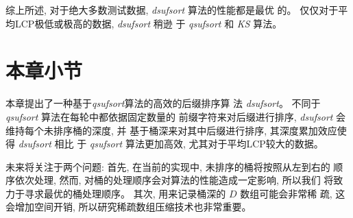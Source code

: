 综上所述, 对于绝大多数测试数据, \emph{dsufsort} 算法的性能都是最优
的。 仅仅对于平均LCP极低或极高的数据, \emph{dsufsort} 稍逊
于 \emph{qsufsort} 和 \emph{KS} 算法。

\section{本章小节}

本章提出了一种基于\emph{qsufsort}算法的高效的后缀排序算
法 \emph{dsufsort}。 不同于 \emph{qsufsort} 算法在每轮中都依据固定数量的
前缀字符来对后缀进行排序, \emph{dsufsort} 会维持每个未排序桶的深度, 并
基于桶深来对其中后缀进行排序, 其深度累加效应使得 \emph{dsufsort} 相比
于 \emph{qsufsort} 算法更加高效, 尤其对于平均LCP较大的数据。

未来将关注于两个问题: 首先, 在当前的实现中, 未排序的桶将按照从左到右的
顺序依次处理, 然而, 对桶的处理顺序会对算法的性能造成一定影响, 所以我们
将致力于寻求最优的桶处理顺序。 其次, 用来记录桶深的 $D$ 数组可能会非常稀
疏, 这会增加空间开销, 所以研究稀疏数组压缩技术也非常重要。








